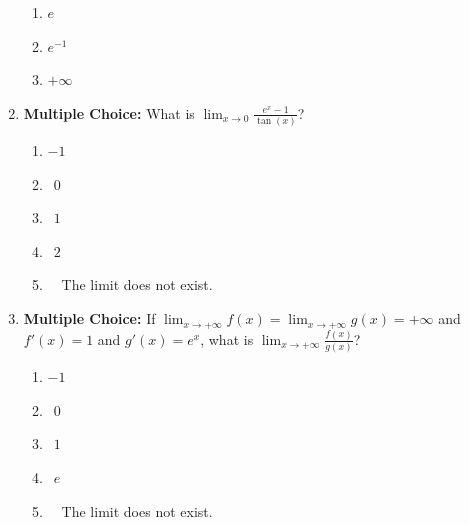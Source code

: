 \documentclass[12pt]{article}
\newif\ifans
\begin{document}
\begin{enumerate}
\begin{enumerate}
\item $e$\\

\item $e^{-1}$\\

\item $+\infty$

\end{enumerate}

\ifans{\fbox{E}} \fi

\item {\bf Multiple Choice:} What is $\displaystyle \lim_{x\rightarrow 0}\frac{e^x-1}{\tan(x)}$?

\begin{enumerate}

\item $-1$\\

\item $\ \ 0$\\

\item $\ \ 1$\\

\item $\ \ 2$\\

\item \ \ The limit does not exist.

\end{enumerate}

\ifans{\fbox{C}} \fi

\item {\bf Multiple Choice:} If $\displaystyle \lim_{x\rightarrow +\infty} f(x) =
\lim_{x\rightarrow +\infty} g(x) = +\infty$ and $f'(x)=1$ and $g'(x)=e^x$, what is 
$\displaystyle \lim_{x\rightarrow +\infty}\frac{f(x)}{g(x)}$?

\begin{enumerate}

\item $-1$

\item $\ \ 0$

\item $\ \ 1$

\item $\ \ e$

\item \ \ The limit does not exist.

\end{enumerate}


\end{enumerate}
\end{document}

